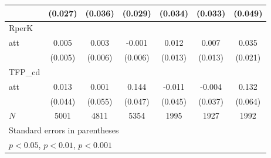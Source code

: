 {\begin{tabular}{l*{6}{c}}
            &     (0.027)         &     (0.036)         &     (0.029)         &     (0.034)         &     (0.033)         &     (0.049)         \\
\hline
RperK       &                     &                     &                     &                     &                     &                     \\
att         &       0.005         &       0.003         &      -0.001         &       0.012         &       0.007         &       0.035         \\
            &     (0.005)         &     (0.006)         &     (0.006)         &     (0.013)         &     (0.013)         &     (0.021)         \\
\hline
TFP\_cd      &                     &                     &                     &                     &                     &                     \\
att         &       0.013         &       0.001         &       0.144\sym{**} &      -0.011         &      -0.004         &       0.132\sym{*}  \\
            &     (0.044)         &     (0.055)         &     (0.047)         &     (0.045)         &     (0.037)         &     (0.064)         \\
\hline
\(N\)       &        5001         &        4811         &        5354         &        1995         &        1927         &        1992         \\
\hline\hline
\multicolumn{7}{l}{\footnotesize Standard errors in parentheses}\\
\multicolumn{7}{l}{\footnotesize \sym{*} \(p<0.05\), \sym{**} \(p<0.01\), \sym{***} \(p<0.001\)}\\
\end{tabular}
}
